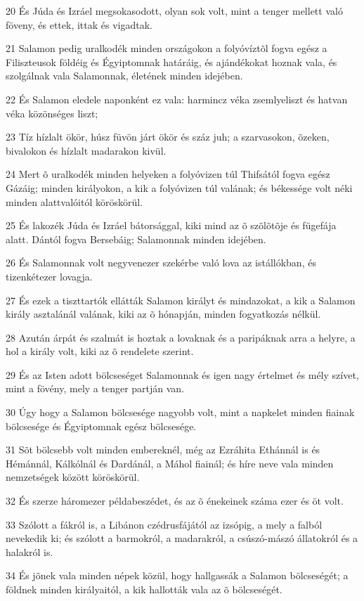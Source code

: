 \par 20 És Júda és Izráel megsokasodott, olyan sok volt, mint a tenger mellett való föveny, és ettek, ittak és vigadtak.
\par 21 Salamon pedig uralkodék minden országokon a folyóvíztõl fogva egész a Filiszteusok földéig és Égyiptomnak határáig, és ajándékokat hoznak vala, és szolgálnak vala Salamonnak, életének minden idejében.
\par 22 És Salamon eledele naponként ez vala: harmincz véka zsemlyeliszt és hatvan véka közönséges liszt;
\par 23 Tíz hízlalt ökör, húsz füvön járt ökör és száz juh; a szarvasokon, õzeken, bivalokon és hízlalt madarakon kivül.
\par 24 Mert õ uralkodék minden helyeken a folyóvizen túl Thifsától fogva egész Gázáig; minden királyokon, a kik a folyóvizen túl valának; és békessége volt néki minden alattvalóitól köröskörül.
\par 25 És lakozék Júda és Izráel bátorsággal, kiki mind az õ szõlõtõje és fügefája alatt. Dántól fogva Bersebáig; Salamonnak minden idejében.
\par 26 És Salamonnak volt negyvenezer szekérbe való lova az istállókban, és tizenkétezer lovagja.
\par 27 És ezek a tiszttartók ellátták Salamon királyt és mindazokat, a kik a Salamon király asztalánál valának, kiki az õ hónapján, minden fogyatkozás nélkül.
\par 28 Azután árpát és szalmát is hoztak a lovaknak és a paripáknak arra a helyre, a hol a király volt, kiki az õ rendelete szerint.
\par 29 És az Isten adott bölcseséget Salamonnak és igen nagy értelmet és mély szívet, mint a fövény, mely a tenger partján van.
\par 30 Úgy hogy a Salamon bölcsesége nagyobb volt, mint a napkelet minden fiainak bölcsesége és Égyiptomnak egész bölcsesége.
\par 31 Sõt bölcsebb volt minden embereknél, még az Ezráhita Ethánnál is és Hémánnál,  Kálkólnál és Dardánál, a Máhol fiainál; és híre neve vala minden nemzetségek között köröskörül.
\par 32 És szerze háromezer példabeszédet, és az õ énekeinek száma ezer és öt volt.
\par 33 Szólott a fákról is, a Libánon czédrusfájától az izsópig, a mely a falból nevekedik ki; és szólott a barmokról, a madarakról, a csúszó-mászó állatokról és a halakról is.
\par 34 És jõnek vala minden népek közül, hogy hallgassák a Salamon bölcseségét; a földnek minden királyaitól, a kik hallották vala az õ bölcseségét.

